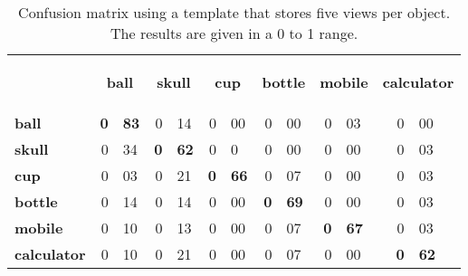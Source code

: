
\begin{table}[H]
\centering
\begin{tabular} {l r@{.}l r@{.}l r@{.}l r@{.}l r@{.}l r@{.}l }
\toprule
\addlinespace[3mm]
   \multicolumn{1}{c}{\begin{center}\textbf{Real} \mid \textbf{Predicted}\end{center}} &
   \multicolumn{2}{c}{\begin{flushright}\textbf{ball}\end{flushright}} &
   \multicolumn{2}{c}{\begin{flushright}\textbf{skull}\end{flushright}} &
   \multicolumn{2}{c}{\begin{flushright}\textbf{cup}\end{flushright}} &
   \multicolumn{2}{c}{\begin{flushright}\textbf{bottle}\end{flushright}} &
   \multicolumn{2}{c}{\begin{flushright}\textbf{mobile}\end{flushright}} &
   \multicolumn{2}{c}{\begin{flushright}\textbf{calculator}\end{flushright}} &\\

\addlinespace[-3mm]

\midrule
\textbf{ball}		&	\textbf{0}&\textbf{83}	&	0&14	&	0&00	&	0&00	&	0&03	&	0&00	\\
\textbf{skull}		&	0&34	&	\textbf{0}&\textbf{62}	&	0&0	&	0&00	&	0&00	&	0&03	\\
\textbf{cup}		&	0&03	&	0&21	&	\textbf{0}&\textbf{66}	&	0&07	&	0&00	&	0&03	\\
\textbf{bottle}		&	0&14	&	0&14	&	0&00	&	\textbf{0}&\textbf{69}	&	0&00	&	0&03	\\
\textbf{mobile}		&	0&10	&	0&13	&	0&00	&	0&07	&	\textbf{0}&\textbf{67}	&	0&03	\\
\textbf{calculator}	&	0&10	&	0&21	&	0&00	&	0&07	&	0&00	&	\textbf{0}&\textbf{62}	\\


\bottomrule
\end{tabular}
\caption[Confusion matrix - templates using 5 views]{Confusion matrix using a template that stores five views per object. The results are given in a 0 to 1 range. }
\label{5views_matrix}
\end{table}


